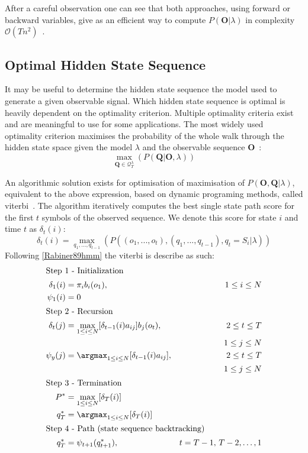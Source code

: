 After a careful observation one can see that both approaches, using forward or backward variables, give as an efficient way to compute $P(\mathbf{O}|\lambda)$ in complexity $\mathcal{O}(Tn^2)$~\cite{Rabiner89hmm}.

\subsection{Optimal Hidden State Sequence}

It may be useful to determine the hidden state sequence the model used to generate a given observable signal. Which hidden state sequence is optimal is heavily dependent on the optimality criterion. Multiple optimality criteria exist and are meaningful to use for some applications. The most widely used optimality criterion maximises the probability of the whole walk through the hidden state space given the model $\lambda$ and the observable sequence $\mathbf{O}$~\cite{Rabiner89hmm}:
$$\max_{\mathbf{Q}\in\mathcal{Q}_T^\lambda}(P(\mathbf{Q}|\mathbf{O}, \lambda))$$

An algorithmic solution exists for optimisation of maximisation of $P(\mathbf{O}, \mathbf{Q}|\lambda)$, equivalent to the above expression, based on dynamic programing methods, called \gls{viterbi}~\cite{Viterbi1967, Forney1973}. The algorithm iteratively computes the best single state path score for the first $t$ symbols of the observed sequence. We denote this score for state $i$ and time $t$ as $\delta_t(i)$:
$$\delta_t(i) = \max_{q_1, ..., q_{t-1}}(P((o_1, ..., o_t), (q_1, ..., q_{t-1}), q_t=S_i|\lambda))$$
Following \ref{Rabiner89hmm} the \gls{viterbi} is describe as such:
	\begin{align}
	\intertext{Step 1 - Initialization}
		\delta_1(i) 	&= \pi_ib_i(o_1),& 1 \leq i \leq N\\
		\psi_1(i) 	&= 0\\
	\intertext{Step 2 - Recursion}
		\delta_t(j)	&= \max_{1 \leq i \leq N}[\delta_{t-1}(i)a_{ij}]b_j(o_t), 	& 2 \leq t \leq T\\
          				&																				& 1 \leq j \leq N\\	
		\psi_y(j) 	&= \argmax_{1 \leq i \leq N}[\delta_{t-1}(i)a_{ij}], 										& 2 \leq t \leq T\\
          				&																				& 1 \leq j \leq N\\
	\intertext{Step 3 - Termination}
		P^* 			&= \max_{1 \leq i \leq N}[\delta_T(i)]\\
		q_T^*		&= \argmax_{1 \leq i \leq N}[\delta_T(i)]\\
	\intertext{Step 4 - Path (state sequence backtracking)}
		q_T^* 		&= \psi_{t+1}(q_{t+1}^*),												& t=T-1, \, T-2, \dots,1
	\end{align}		

